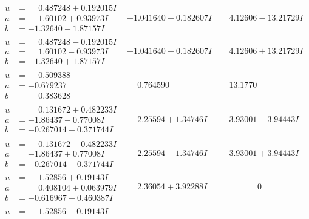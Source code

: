 \documentclass[1p]{elsarticle_modified}
\theoremstyle{definition}
\begin{document}
$$\begin{array}{c|c|c}
\begin{aligned}
u &= \phantom{-}0.487248 + 0.192015 I \\
a &= \phantom{-}1.60102 + 0.93973 I \\
b &= -1.32640 - 1.87157 I\end{aligned}
 & -1.041640 + 0.182607 I & \phantom{-}4.12606 - 13.21729 I \\ \hline\begin{aligned}
u &= \phantom{-}0.487248 - 0.192015 I \\
a &= \phantom{-}1.60102 - 0.93973 I \\
b &= -1.32640 + 1.87157 I\end{aligned}
 & -1.041640 - 0.182607 I & \phantom{-}4.12606 + 13.21729 I \\ \hline\begin{aligned}
u &= \phantom{-}0.509388\phantom{ +0.000000I} \\
a &= -0.679237\phantom{ +0.000000I} \\
b &= \phantom{-}0.383628\phantom{ +0.000000I}\end{aligned}
 & \phantom{-}0.764590\phantom{ +0.000000I} & \phantom{-}13.1770\phantom{ +0.000000I} \\ \hline\begin{aligned}
u &= \phantom{-}0.131672 + 0.482233 I \\
a &= -1.86437 - 0.77008 I \\
b &= -0.267014 + 0.371744 I\end{aligned}
 & \phantom{-}2.25594 + 1.34746 I & \phantom{-}3.93001 - 3.94443 I \\ \hline\begin{aligned}
u &= \phantom{-}0.131672 - 0.482233 I \\
a &= -1.86437 + 0.77008 I \\
b &= -0.267014 - 0.371744 I\end{aligned}
 & \phantom{-}2.25594 - 1.34746 I & \phantom{-}3.93001 + 3.94443 I \\ \hline\begin{aligned}
u &= \phantom{-}1.52856 + 0.19143 I \\
a &= \phantom{-}0.408104 + 0.063979 I \\
b &= -0.616967 - 0.460387 I\end{aligned}
 & \phantom{-}2.36054 + 3.92288 I & \phantom{-0.000000 } 0 \\ \hline\begin{aligned}
u &= \phantom{-}1.52856 - 0.19143 I \\

\end{aligned}
\end{array}$$
\end{document}
